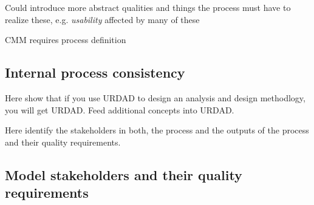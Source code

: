 Could introduce more abstract qualities and things the process must have to realize these, e.g. \emph{usability} affected by many of these

CMM requires process definition


\subsection{Internal process consistency}

Here show that if you use URDAD to design an analysis and design methodlogy, you will get URDAD. Feed additional concepts into URDAD.

Here identify the stakeholders in both, the process and the outputs of the process and their quality requirements.

\subsection{Model stakeholders and their quality requirements}
